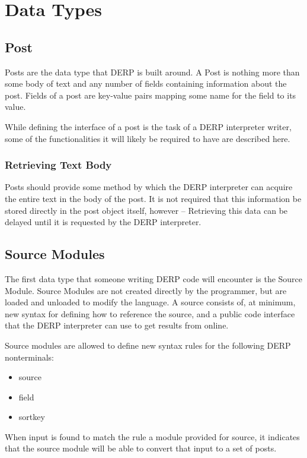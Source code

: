 \section{Data Types}

\subsection{Post}
Posts are the data type that DERP is built around. A Post is nothing more than some body 
of text and any number of fields containing information about the post. Fields of a post 
are key-value pairs mapping some name for the field to its value.

While defining the interface of a post is the task of a DERP interpreter writer, some of 
the functionalities it will likely be required to have are described here.

\subsubsection{Retrieving Text Body}
Posts should provide some method by which the DERP interpreter can acquire the entire 
text in the body of the post. It is not required that this information be stored directly 
in the post object itself, however -- Retrieving this data can be delayed until it is 
requested by the DERP interpreter.

\subsection{Source Modules}
The first data type that someone writing DERP code will encounter is the Source Module. 
Source Modules are not created directly by the programmer, but are loaded and unloaded to 
modify the language. A source consists of, at minimum, new syntax for defining how to 
reference the source, and a public code interface that the DERP interpreter can use to 
get results from online.

Source modules are allowed to define new syntax rules for the following DERP nonterminals:
\begin{itemize}
\item source
\item field
\item sortkey
\end{itemize}
When input is found to match the rule a module provided for source, it indicates that the 
source module will be able to convert that input to a set of posts.

